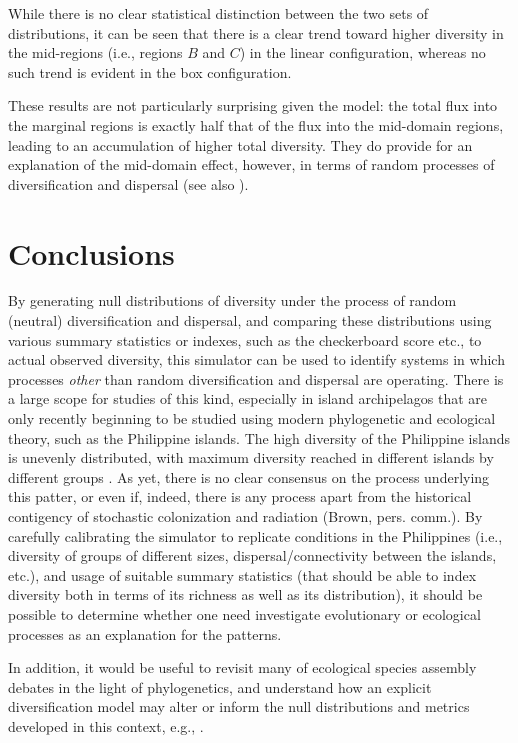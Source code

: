 \documentclass[11pt]{article}
\begin{document}
While there is no clear statistical distinction between the two sets of distributions, it can be seen that there is a clear trend toward higher diversity in the mid-regions (i.e., regions $B$ and $C$) in the linear configuration, whereas no such trend is evident in the box configuration.

These results are not particularly surprising given the model: the total flux into the marginal regions is exactly half that of the flux into the mid-domain regions, leading to an accumulation of higher total diversity.
They do provide for an explanation of the mid-domain effect, however, in terms of random processes of diversification and dispersal (see also \citet{Connolly2005a}).

\section*{Conclusions}

By generating null distributions of diversity under the process of random (neutral) diversification and dispersal, and comparing these distributions using various summary statistics or indexes, such as the checkerboard score etc., to actual observed diversity, this simulator can be used to identify systems in which processes \textit{other} than random diversification and dispersal are operating.
There is a large scope for studies of this kind, especially in island archipelagos that are only recently beginning to be studied using modern phylogenetic and ecological theory, such as the Philippine islands.
The high diversity of the Philippine islands is unevenly distributed, with maximum diversity reached in different islands by different groups \citep{Diamond1983a,Heaney2005a,Heaney1968a,Steppan2003a,Tougard2001a,Wuster1990a}.
As yet, there is no clear consensus on the process underlying this patter, or even if, indeed, there is any process apart from the historical contigency of stochastic colonization and radiation (Brown, pers. comm.).
By carefully calibrating the simulator to replicate conditions in the Philippines (i.e., diversity of groups of different sizes, dispersal/connectivity between the islands, etc.), and usage of suitable summary statistics (that should be able to index diversity both in terms of its richness as well as its distribution), it should be possible to determine whether one need investigate evolutionary or ecological processes as an explanation for the patterns.

In addition, it would be useful to revisit many of ecological species assembly debates in the light of phylogenetics, and understand how an explicit diversification model may alter or inform the null distributions and metrics developed in this context, e.g., \citet{Diamond1983a, Stone1990a, Stone1992a, Gotelli2002a, Gotelli2000a, Feeley2003a, Ulrich2004a}.



\end{document}

